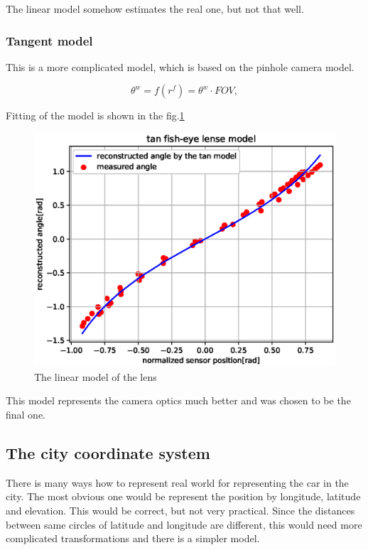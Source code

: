 \documentclass[a4paper,12pt,titlepage, twoside]{article}
\numberwithin{figure}{section}
\begin{document}
The linear model somehow estimates the real one, but not that well.

\subsubsection{Tangent model}

This is a more complicated model, which is based on the pinhole camera model.

\begin{equation}
\theta^w = f(r^f) = \theta^w \cdot FOV,
\end{equation}

Fitting of the model is shown in the fig.\ref{fig:linear_model}

\begin{figure}[h!]
\centering
\includegraphics[width=1\linewidth]{fig/tan_model2.eps}
\caption{The linear model of the lens}
\label{fig:linear_model}
\end{figure}

This model represents the camera optics much better and was chosen to be the final one.

\subsection{The city coordinate system}

There is many ways how to represent real world for representing the car in the city. The most obvious one would be represent the position by longitude, latitude and elevation. This would be correct, but not very practical. Since the distances between same circles of latitude and longitude are different, this would need more complicated transformations and there is a simpler model. 
\end{document}
